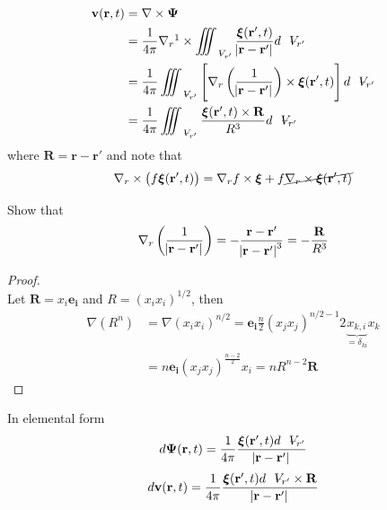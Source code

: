 \begin{align}
\mathbf{v}(\mathbf{r},t)
&= \nabla\times\boldsymbol{\Psi}\nonumber\\
&= \frac{1}{4\pi}\nabla_r\footnotemark\times\iiint_{\volume_{r'}}\frac{\boldsymbol{\xi}(\mathbf{r'},t)}{\abs{\mathbf{r}-\mathbf{r'}}}d\volume_{r'}\nonumber \\
&= \frac{1}{4\pi}\iiint_{\volume_{r'}}\left[\nabla_r\left(\frac{1}{\abs{\mathbf{r}-\mathbf{r'}}}\right)\times\boldsymbol{\xi}(\mathbf{r'},t)\right]d\volume_{r'}\nonumber \\
&= \frac{1}{4\pi}\iiint_{\volume_{r'}}\frac{\boldsymbol{\xi}(\mathbf{r'},t)\times\mathbf{R}}{R^3}d\volume_{r'}\label{eq: 4-5-3}
\end{align}
where $\mathbf{R} = \mathbf{r} - \mathbf{r'}$ and note that
\[
\nabla_r\times\left(f\boldsymbol{\xi}(\mathbf{r'},t)\right) = \nabla_r f\times\boldsymbol{\xi} + f\cancel{\nabla_r\times\boldsymbol{\xi}(\mathbf{r'},t)}
\]
\begin{exercise}{Show that}\\
\[
\nabla_r\left(\frac{1}{\abs{\mathbf{r}-\mathbf{r'}}}\right) = - \frac{\mathbf{r}-\mathbf{r'}}{\abs{\mathbf{r}-\mathbf{r'}}^3} = -\frac{\mathbf{R}}{R^3}
\]
\begin{proof}\mbox{}\\
Let $\mathbf{R} = x_i\mathbf{e_i}$ and $R = (x_ix_i)^{1/2}$, then 
\begin{align*}
\nabla\left(R^n\right)
&= \nabla\left(x_ix_i\right)^{n/2} = \mathbf{e_i}\frac{n}{2}\left(x_jx_j\right)^{n/2 -1}2\underbrace{x_{k,i}}_{=\delta_{ki}}x_k \\
&= n\mathbf{e_i}\left(x_jx_j\right)^{\frac{n-2}{2}}x_i = nR^{n-2}\mathbf{R}
\end{align*}
\end{proof}
\end{exercise}
In elemental form
\begin{equation}
d\boldsymbol{\Psi}(\mathbf{r},t) = \frac{1}{4\pi}\frac{\boldsymbol{\xi}(\mathbf{r'},t)d\volume_{r'}}{\abs{\mathbf{r}-\mathbf{r'}}}
\label{eq: 4-5-4}
\end{equation}
\begin{equation}
d\mathbf{v}(\mathbf{r},t) = \frac{1}{4\pi}\frac{\boldsymbol{\xi}(\mathbf{r'},t)d\volume_{r'}\times\mathbf{R}}{\abs{\mathbf{r}-\mathbf{r'}}}
\label{eq: 4-5-5}
\end{equation}
